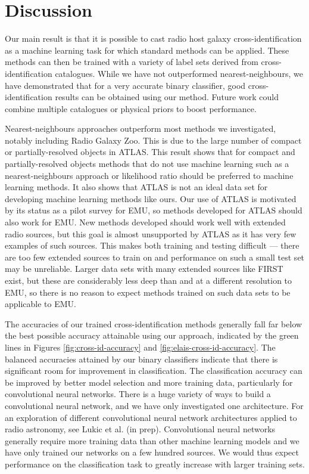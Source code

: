 \documentclass[fleqn,usenatbib,usedcolumn]{mnras}
\begin{document}
\section{Discussion}

  Our main result is that it is possible to cast radio host galaxy cross-identification as a machine learning task for which standard methods can be applied. These methods can then be trained with a variety of label sets derived from cross-identification catalogues. While we have not outperformed nearest-neighbours, we have demonstrated that for a very accurate binary classifier, good cross-identification results can be obtained using our method. Future work could combine multiple catalogues or physical priors to boost performance.

  Nearest-neighbours approaches outperform most methods we investigated, notably including Radio Galaxy Zoo. This is due to the large number of compact or partially-resolved objects in ATLAS. This result shows that for compact and partially-resolved objects methods that do not use machine learning such as a nearest-neighbours approach or likelihood ratio \citep{weston18lrpy} should be preferred to machine learning methods. It also shows that ATLAS is not an ideal data set for developing machine learning methods like ours. Our use of ATLAS is motivated by its status as a pilot survey for EMU, so methods developed for ATLAS should also work for EMU. New methods developed should work well with extended radio sources, but this goal is almost unsupported by ATLAS as it has very few examples of such sources. This makes both training and testing difficult --- there are too few extended sources to train on and performance on such a small test set may be unreliable. Larger data sets with many extended sources like FIRST exist, but these are considerably less deep than and at a different resolution to EMU, so there is no reason to expect methods trained on such data sets to be applicable to EMU.

  The accuracies of our trained cross-identification methods generally fall far below the best possible accuracy attainable using our approach, indicated by the green lines in Figures \ref{fig:cross-id-accuracy} and \ref{fig:elais-cross-id-accuracy}. The balanced accuracies attained by our
  binary classifiers indicate that there is significant room for improvement
  in classification. The classification accuracy can be improved by better
  model selection and more training data, particularly for convolutional
  neural networks. There is a huge variety of ways to build a convolutional
  neural network, and we have only investigated one architecture. For an
  exploration of different convolutional neural network architectures
  applied to radio astronomy, see Lukic et al. (in prep). Convolutional
  neural networks generally require more training data than other machine
  learning models and we have only trained our networks on a few hundred
  sources. We would thus expect performance on the classification task to
  greatly increase with larger training sets.
\end{document}
